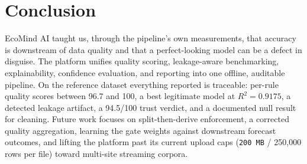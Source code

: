 \documentclass[conference]{IEEEtran}
\begin{document}
\section{Conclusion}

EcoMind AI taught us, through the pipeline's own measurements, that accuracy is downstream of data quality and that a perfect-looking model can be a defect in disguise. The platform unifies quality scoring, leakage-aware benchmarking, explainability, confidence evaluation, and reporting into one offline, auditable pipeline. On the reference dataset everything reported is traceable: per-rule quality scores between 96.7 and 100, a best legitimate model at $R^2 = 0.9175$, a detected leakage artifact, a 94.5/100 trust verdict, and a documented null result for cleaning. Future work focuses on split-then-derive enforcement, a corrected quality aggregation, learning the gate weights against downstream forecast outcomes, and lifting the platform past its current upload caps (\texttt{200~MB} / 250{,}000 rows per file) toward multi-site streaming corpora.
\end{document}
